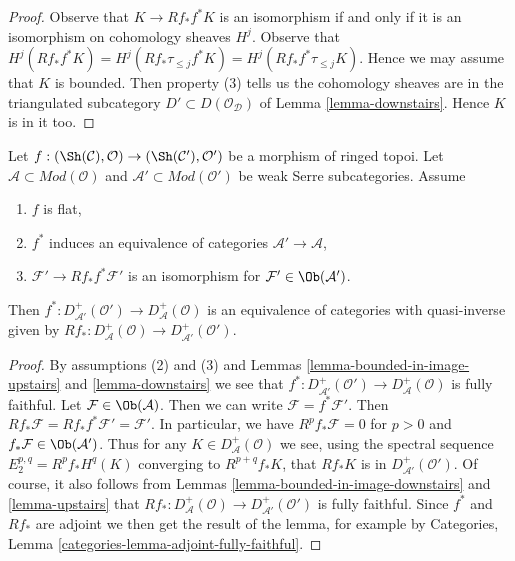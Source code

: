 \begin{proof}
Observe that $K \to Rf_*f^*K$ is an isomorphism if and only
if it is an isomorphism on cohomology sheaves $H^j$. Observe that
$H^j(Rf_*f^*K) = H^j(Rf_*\tau_{\leq j}f^*K) = H^j(Rf_*f^*\tau_{\leq j}K)$.
Hence we may assume that $K$ is bounded. Then property (3)
tells us the cohomology sheaves are in the triangulated
subcategory $D' \subset D(\mathcal{O}_\mathcal{D})$ of
Lemma \ref{lemma-downstairs}. Hence $K$ is in it too.
\end{proof}

\begin{lemma}
\label{lemma-equivalence-bounded}
Let $f : (\Sh(\mathcal{C}), \mathcal{O}) \to (\Sh(\mathcal{C}'), \mathcal{O}')$
be a morphism of ringed topoi.
Let $\mathcal{A} \subset \textit{Mod}(\mathcal{O})$
and $\mathcal{A}' \subset \textit{Mod}(\mathcal{O}')$
be weak Serre subcategories. Assume
\begin{enumerate}
\item $f$ is flat,
\item $f^*$ induces an equivalence of categories
$\mathcal{A}' \to \mathcal{A}$,
\item $\mathcal{F}' \to Rf_*f^*\mathcal{F}'$ is an isomorphism
for $\mathcal{F}' \in \Ob(\mathcal{A}')$.
\end{enumerate}
Then
$f^* : D_{\mathcal{A}'}^+(\mathcal{O}') \to D_\mathcal{A}^+(\mathcal{O})$
is an equivalence of categories with quasi-inverse given by
$Rf_* : D_\mathcal{A}^+(\mathcal{O}) \to D_{\mathcal{A}'}^+(\mathcal{O}')$.
\end{lemma}

\begin{proof}
By assumptions (2) and (3) and
Lemmas \ref{lemma-bounded-in-image-upstairs} and \ref{lemma-downstairs}
we see that
$f^* : D_{\mathcal{A}'}^+(\mathcal{O}') \to D_\mathcal{A}^+(\mathcal{O})$
is fully faithful.
Let $\mathcal{F} \in \Ob(\mathcal{A})$. Then we can write
$\mathcal{F} = f^*\mathcal{F}'$. Then
$Rf_*\mathcal{F} = Rf_* f^*\mathcal{F}' = \mathcal{F}'$.
In particular, we have $R^pf_*\mathcal{F} = 0$ for $p > 0$
and $f_*\mathcal{F} \in \Ob(\mathcal{A}')$.
Thus for any $K \in D^+_\mathcal{A}(\mathcal{O})$ we see,
using the spectral sequence $E_2^{p, q} = R^pf_*H^q(K)$
converging to $R^{p + q}f_*K$,
that $Rf_*K$ is in $D^+_{\mathcal{A}'}(\mathcal{O}')$.
Of course, it also follows from
Lemmas \ref{lemma-bounded-in-image-downstairs} and \ref{lemma-upstairs}
that $Rf_* : D_\mathcal{A}^+(\mathcal{O}) \to D_{\mathcal{A}'}^+(\mathcal{O}')$
is fully faithful. Since $f^*$ and $Rf_*$ are adjoint
we then get the result of the lemma, for example by
Categories, Lemma \ref{categories-lemma-adjoint-fully-faithful}.
\end{proof}

